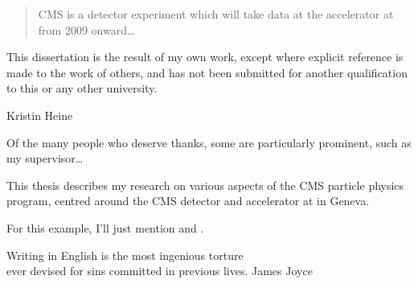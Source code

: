 
\begin{abstract}%
  CMS is a detector experiment which will take data at
  the \LHC accelerator at \CERN from 2009 onward\dots
\end{abstract}


\begin{declaration}
  This dissertation is the result of my own work, except where explicit
  reference is made to the work of others, and has not been submitted
  for another qualification to this or any other university. 
  \vspace*{1cm}
  \begin{flushright}
    Kristin Heine
  \end{flushright}
\end{declaration}


\begin{acknowledgements}
  Of the many people who deserve thanks, some are particularly prominent,
  such as my supervisor\dots
\end{acknowledgements}


\begin{preface}
  This thesis describes my research on various aspects of the CMS
  particle physics program, centred around the CMS detector and \LHC
  accelerator at \CERN in Geneva.

  \noindent
  For this example, I'll just mention 
  and .
\end{preface}

\tableofcontents

\frontquote%
  {Writing in English is the most ingenious torture\\
   ever devised for sins committed in previous lives.}%
  {James Joyce}
